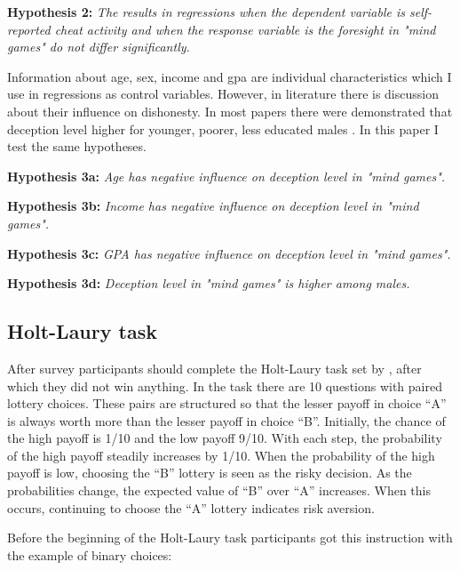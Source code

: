 \documentclass[12pt]{article}
\begin{document}
	\vspace{0.2cm}
	
	\textbf{Hypothesis 2:}
	 \textit{The results in regressions when the dependent variable is self-reported cheat activity and when the response variable is the foresight in "mind games" do not differ significantly.}
	
	Information about age, sex, income and gpa are individual characteristics which I use in regressions as control variables. However, in literature there is discussion about their influence on dishonesty. In most papers there were demonstrated that deception level higher for younger, poorer, less educated males \cite{mol2020not, zimerman2014self, kerkvliet1994cheating, arneklev1993low}. In this paper I test the same hypotheses.
	
	\vspace{0.2cm}
	
	\textbf{Hypothesis 3a:}
	\textit{Age has negative influence on deception level in "mind games".}
	
		\textbf{Hypothesis 3b:}
	\textit{Income has negative influence on deception level in "mind games".}
	
		\textbf{Hypothesis 3c:}
	\textit{GPA has negative influence on deception level in "mind games".}
	
		\textbf{Hypothesis 3d:}
	\textit{Deception level in "mind games" is higher among males.}
	\vspace{-0.2cm}
	
	\subsection{Holt-Laury task}

	After survey participants should complete the Holt-Laury task set by \cite{holt2002risk}, after which they did not win anything. In the task there are 10 questions with paired lottery choices. These pairs are structured so that the lesser payoff in choice “A” is always worth more than the lesser payoff in choice “B”. Initially, the chance of the high payoff is 1/10 and the low payoff 9/10. With each step, the probability of the high payoff steadily increases by 1/10. When the probability of the high payoff is low, choosing the “B” lottery is seen as the risky decision. As the probabilities change, the expected value of “B” over “A” increases. When this occurs, continuing to choose the “A” lottery indicates risk aversion. 

	Before the beginning of the Holt-Laury task participants got this instruction with the example of binary choices: 
	
\end{document}
